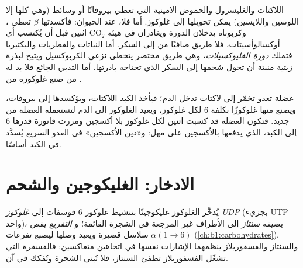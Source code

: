\begin{proposition}\label{prop:b1:biosyntheses-integration:cannot}
اللاكتات والغليسرول والحموض الأمينية التي تعطي بيروفاتًا أو وسائط
 (وهي كلها إلا اللوسين واللايسين) يمكن تحويلها إلى غلوكوز.
أما  فلا، عند الحيوان: فأكسدتها $\beta$ تعطي
، وكربوناه يدخلان الدورة ويغادران في هيئة $\mathrm{CO_2}$
اثنين قبل أن يُكتسب أي أوكسالوأسيتات، فلا طريق صافيًا من 
إلى السكر. أما النباتات والفطريات والبكتيريا فتملك \emph{دورة
الغليوكسيلات}، وهي طريق مختصر يتخطى نزعي الكربوكسيل ويتيح لبذرة زيتية
منبتة أن تحول شحمها إلى السكر الذي تحتاجه بادرتها. أما الثديي الجائع
فلا بد له من صنع غلوكوزه من .
\end{proposition}

\begin{example}\label{ex:b1:biosyntheses-integration:cori}
عضلة تعدو تخمّر  إلى لاكتات تدخل الدم؛ فيأخذ الكبد
اللاكتات، ويؤكسدها إلى بيروفات، ويصنع منها غلوكوزًا بكلفة 6  لكل
غلوكوز، ويعيد الغلوكوز إلى الدم لتستعمله العضلة من جديد. فتكون العضلة
قد كسبت  اثنين لكل غلوكوز بلا أكسجين ومررت فاتورة قدرها 6 إلى
الكبد، الذي يدفعها بالأكسجين على مهل: و«دين الأكسجين» في العدو
السريع يُسدَّد في الكبد أساسًا.
\end{example}

\section{الادخار: الغليكوجين والشحم}

\begin{definition}\label{def:b1:biosyntheses-integration:glycogensynthesis}
يُدخَّر الغلوكوز غليكوجينًا بتنشيط غلوكوز-6-فوسفات إلى
\emph{غلوكوز-UDP} (بجزيء UTP واحد)، يضيفه \emph{سنتاز } إلى
الأطراف غير المرجعة في الشجرة القائمة؛ و\emph{ التفريع} يقص
سلاسل قصيرة ويعيد وصلها ليصنع تفرعات $\alpha(1{\to}6)$
(\cref{ch:b1:carbohydrates}). والسنتاز والفسفوريلاز ينظمهما الإشارات
نفسها في اتجاهين متعاكسين: فالفسفرة التي تشغّل الفسفوريلاز تطفئ
السنتاز، فلا تُبنى الشجرة وتُفكك في آن.
\end{definition}

